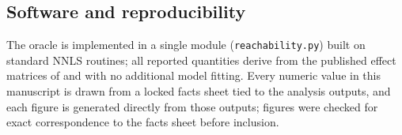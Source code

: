 \subsection{Software and reproducibility}
\label{sec:methods-software}
The oracle is implemented in a single module (\texttt{reachability.py}) built on standard
NNLS routines; all reported quantities derive from the published effect matrices of
\citet{Zhu2025} and \citet{Norman2019} with no additional model fitting. Every numeric value
in this manuscript is drawn from a locked facts sheet tied to the analysis outputs, and each
figure is generated directly from those outputs; figures were checked for exact
correspondence to the facts sheet before inclusion.
